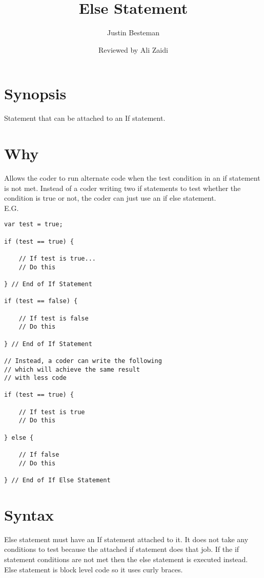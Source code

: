 \documentclass[12pt, letterpaper]{article}
\title{Else Statement}
\author{Justin Besteman}
\date{Reviewed by Ali Zaidi}
\begin{document}
\maketitle


\section*{Synopsis}

Statement that can be attached to an If statement. 


\section*{Why}

Allows the coder to run alternate code when the test condition in an if statement is not met. Instead of a coder writing two if statements to test whether the condition is true or not, the coder can just use an if else statement. \\
E.G. \\
\begin{lstlisting}
var test = true;

if (test == true) {

	// If test is true...
	// Do this

} // End of If Statement

if (test == false) {

	// If test is false
	// Do this

} // End of If Statement

// Instead, a coder can write the following
// which will achieve the same result 
// with less code

if (test == true) {

	// If test is true
	// Do this

} else {

	// If false
	// Do this

} // End of If Else Statement
\end{lstlisting}

\section*{Syntax}

Else statement must have an If statement attached to it. It does not take any conditions to test because the attached if statement does that job. If the if statement conditions are not met then the else statement is executed instead. Else statement is block level code so it uses curly braces.
\end{document}
